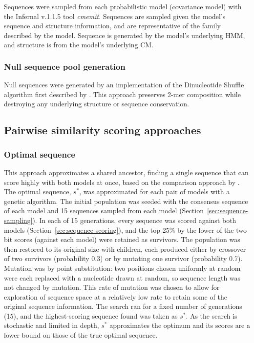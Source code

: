 Sequences were sampled from each probabilistic model (covariance model) with the Infernal v.1.1.5 tool \emph{cmemit}.
Sequences are sampled given the model's sequence and structure information, and are representative of the family described by the model.
Sequence is generated by the model's underlying \ac{HMM}, and structure is from the model's underlying \ac{CM}.

\subsubsection{Null sequence pool generation}
\label{sec:dinuc-shuffle}

Null sequences were generated by an implementation of the Dinucleotide Shuffle algorithm first described by \citet{Altschul1985}.
This approach preserves 2-mer composition while destroying any underlying structure or sequence conservation.

\subsection{Pairwise similarity scoring approaches}

\subsubsection{Optimal sequence}
\label{subsubsec:optimal-sequence}

This approach approximates a shared ancestor, finding a single sequence that can score highly with both models at once, based on the comparison approach by \citet{Eggenhofer2013}.
The optimal sequence, $s^{*}$, was approximated for each pair of models with a genetic algorithm.
The initial population was seeded with the consensus sequence of each model and 15 sequences sampled from each model (Section~\ref{sec:sequence-sampling}).
In each of 15 generations, every sequence was scored against both models (Section~\ref{sec:sequence-scoring}), and the top 25\% by the lower of the two bit scores (against each model) were retained as survivors.
The population was then restored to its original size with children, each produced either by crossover of two survivors (probability 0.3) or by mutating one survivor (probability 0.7).
Mutation was by point substitution: two positions chosen uniformly at random were each replaced with a nucleotide drawn at random, so sequence length was not changed by mutation.
This rate of mutation was chosen to allow for exploration of sequence space at a relatively low rate to retain some of the original sequence information.
The search ran for a fixed number of generations (15), and the highest-scoring sequence found was taken as $s^{*}$.
As the search is stochastic and limited in depth, $s^{*}$ approximates the optimum and its scores are a lower bound on those of the true optimal sequence.

